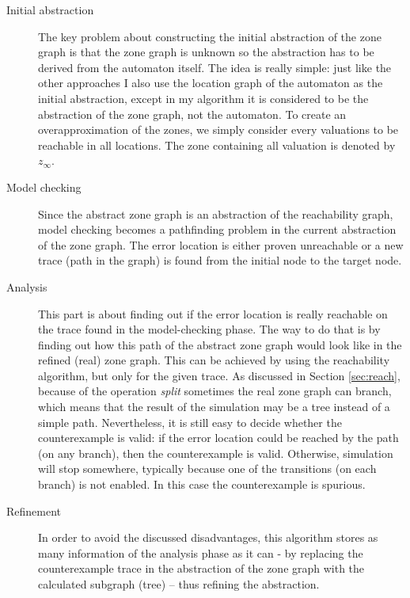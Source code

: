  \begin{description}
 	\item[Initial abstraction] The key problem about constructing the initial abstraction of the zone graph is that the zone graph is unknown so the abstraction has to be derived from the automaton itself. The idea is really simple: just like the other approaches I also use the location graph of the automaton as the initial abstraction, except in my algorithm it is considered to be the abstraction of the zone graph, not the automaton. To create an overapproximation of the zones, we simply consider every valuations to be reachable in all locations. The zone containing all valuation is denoted by $z_\infty$.
 	\item[Model checking] Since the abstract zone graph is an abstraction of the reachability graph, model checking becomes a pathfinding problem in the current abstraction of the zone graph. The error location is either proven unreachable or a new trace (path in the graph) is found from the initial node to the target node.
 	\item[Analysis] This part is about finding out if the error location is really reachable on the trace found in the model-checking phase. The way to do that is by finding out how this path of the abstract zone graph would look like in the refined (real) zone graph. This can be achieved by using the reachability algorithm, but only for the given trace. As discussed in Section \ref{sec:reach}, because of the operation \emph{split} sometimes the real zone graph can branch, which means that the result of the simulation may be a tree instead of a simple path. Nevertheless, it is still easy to decide whether the counterexample is valid: if the error location could be reached by the path (on any branch), then the counterexample is valid. Otherwise, simulation will stop somewhere, typically because one of the transitions (on each branch) is not enabled. In this case the counterexample is spurious.
 	\item[Refinement] In order to avoid the discussed disadvantages, this algorithm stores as many information of the analysis phase as it can - by replacing the counterexample trace in the abstraction of the zone graph with the calculated subgraph (tree) -- thus refining the abstraction.
 \end{description}

